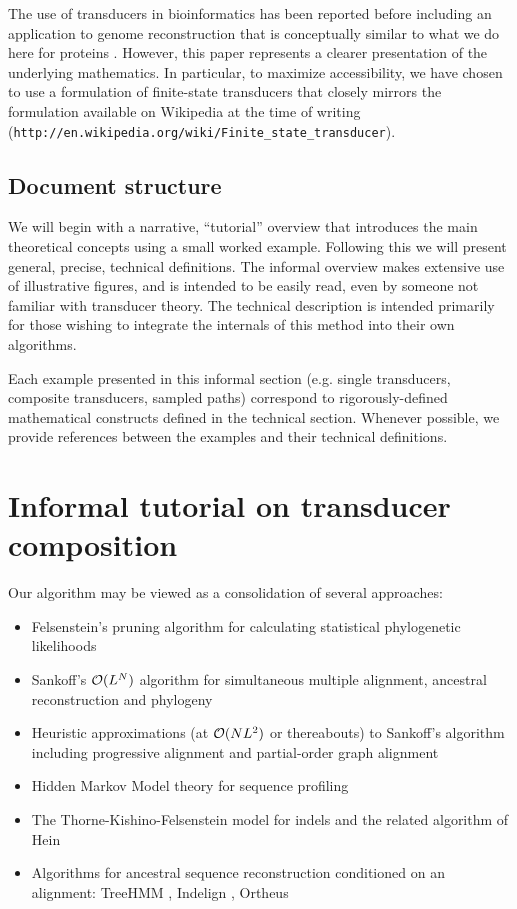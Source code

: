 \documentclass{article}
\begin{document}
The use of transducers in bioinformatics has been reported before \cite{Holmes2003,BradleyHolmes2007,SatijaEtAl2008,PatenEtAl2008}
including an application to genome reconstruction that is conceptually similar to what we do here for proteins \cite{PatenEtAl2008}.
However, this paper represents a clearer presentation of the underlying mathematics.
In particular, to maximize accessibility, we have chosen to use a formulation of finite-state transducers
that closely mirrors the formulation available on Wikipedia at the time of writing ({\tt http://en.wikipedia.org/wiki/Finite\_state\_transducer}).


\subsection{Document structure}  
We will begin with a narrative, ``tutorial'' overview that introduces the main
 theoretical concepts using a small worked example.
Following this we will present general, precise, technical definitions.
The informal overview makes extensive use of illustrative figures,
and is intended to be easily read, even by someone not familiar with transducer theory. 
The technical description is intended primarily for those wishing to integrate the 
internals of this method into their own algorithms.  

Each example presented in this informal section
 (e.g. single transducers, composite transducers, sampled paths) 
correspond to rigorously-defined mathematical constructs defined in the technical section. 
Whenever possible, we provide references between the examples and their technical definitions.

\section{Informal tutorial on transducer composition}

Our algorithm may be viewed as a consolidation of several approaches:
\begin{itemize}
\item Felsenstein's pruning algorithm for calculating statistical phylogenetic likelihoods \cite{Felsenstein81}
\item Sankoff's ${\cal O}(L^N)$ algorithm for simultaneous multiple alignment, ancestral reconstruction and phylogeny \cite{SankoffCedergren83}
\item Heuristic approximations (at ${\cal O}(NL^2)$ or thereabouts) to Sankoff's algorithm including progressive alignment \cite{HigginsSharp89} and partial-order graph alignment \cite{LeeGrassoSharlow2002}
\item Hidden Markov Model theory for sequence profiling \cite{Durbin98}
\item The Thorne-Kishino-Felsenstein model for indels \cite{ThorneEtal91}
 and the related algorithm of Hein \cite{Hein2001}
\item Algorithms for ancestral sequence reconstruction conditioned on an alignment:
 TreeHMM \cite{DialloEtAl2007}, Indelign \cite{KimSinha2007}, Ortheus \cite{PatenEtAl2008}
\end{itemize}
\end{document}
